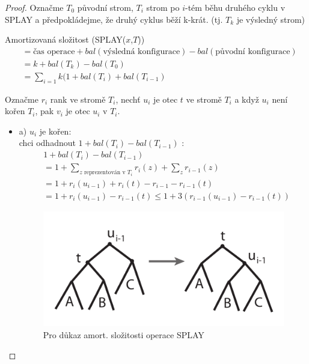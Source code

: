 \begin{proof}
Označme $T_0$ původní strom, $T_i$ strom po $i$-tém běhu druhého cyklu 
v SPLAY a
předpokládejme, že druhý cyklus běží k-krát. (tj. $T_k$ je výsledný strom)
\par
Amortizovaná složitost (SPLAY($x$,$T$)) 
\begin{equation}
\begin{split}
& = \text{čas operace} + bal(\text{výsledná konfigurace}) - 
bal(\text{původní konfigurace}) \\ 
& = k + bal(T_k) - bal(T_0) \\
& = \sum_{i=1}{k}(1 + bal(T_i) + bal(T_{i-1})
\end{split}
\end{equation}

Označme $r_i$ rank ve stromě $T_i$, nechť $u_i$ je otec $t$ ve stromě
$T_i$ a když $u_i$ není kořen $T_i$, pak $v_i$ je otec $u_i$ v $T_i$.

\begin{itemize}
\item a)
$u_i$ je kořen: \\
chci odhadnout $1 + bal(T_i) - bal(T_{i-1})$ :
\begin{equation}
\begin{split}
& 1 + bal(T_i) - bal(T_{i-1}) \\
& = 1 + \sum_{z \text{ reprezentován v }T_i} r_i(z) + \sum_{z} r_{i-1}(z) \\
& = 1 + r_i(u_{i-1}) + r_i(t) - r_{i-1} - r_{i-1}(t) \\
& = 1 + r_i(u_{i-1}) - r_{i-1}(t) 
\leq 1 + 3(r_{i-1}(u_{i-1}) - r_{i-1}(t))
\end{split}
\end{equation}

\begin{figure}[!htb]
\centering\includegraphics{pics/splay-amortproof1}
\caption{Pro důkaz amort. složitosti operace SPLAY}
\label{splay-amortproof1}
\end{figure}


\end{itemize}
\end{proof}
